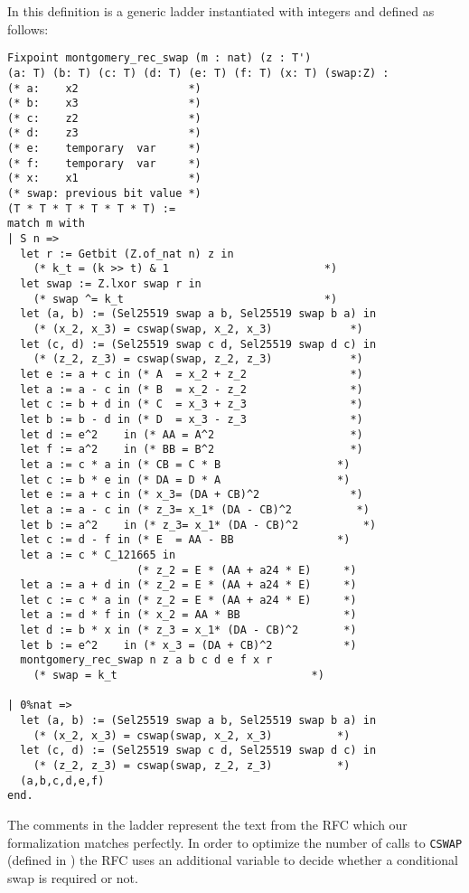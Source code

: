 In this definition  is a generic ladder instantiated
with integers and defined as follows:
\begin{lstlisting}[language=Coq]
Fixpoint montgomery_rec_swap (m : nat) (z : T')
(a: T) (b: T) (c: T) (d: T) (e: T) (f: T) (x: T) (swap:Z) :
(* a:    x2                 *)
(* b:    x3                 *)
(* c:    z2                 *)
(* d:    z3                 *)
(* e:    temporary  var     *)
(* f:    temporary  var     *)
(* x:    x1                 *)
(* swap: previous bit value *)
(T * T * T * T * T * T) :=
match m with
| S n =>
  let r := Getbit (Z.of_nat n) z in
    (* k_t = (k >> t) & 1                        *)
  let swap := Z.lxor swap r in
    (* swap ^= k_t                               *)
  let (a, b) := (Sel25519 swap a b, Sel25519 swap b a) in
    (* (x_2, x_3) = cswap(swap, x_2, x_3)            *)
  let (c, d) := (Sel25519 swap c d, Sel25519 swap d c) in
    (* (z_2, z_3) = cswap(swap, z_2, z_3)            *)
  let e := a + c in (* A  = x_2 + z_2                *)
  let a := a - c in (* B  = x_2 - z_2                *)
  let c := b + d in (* C  = x_3 + z_3                *)
  let b := b - d in (* D  = x_3 - z_3                *)
  let d := e^2    in (* AA = A^2                     *)
  let f := a^2    in (* BB = B^2                     *)
  let a := c * a in (* CB = C * B                  *)
  let c := b * e in (* DA = D * A                  *)
  let e := a + c in (* x_3= (DA + CB)^2              *)
  let a := a - c in (* z_3= x_1* (DA - CB)^2          *)
  let b := a^2    in (* z_3= x_1* (DA - CB)^2          *)
  let c := d - f in (* E  = AA - BB                *)
  let a := c * C_121665 in
                    (* z_2 = E * (AA + a24 * E)     *)
  let a := a + d in (* z_2 = E * (AA + a24 * E)     *)
  let c := c * a in (* z_2 = E * (AA + a24 * E)     *)
  let a := d * f in (* x_2 = AA * BB                *)
  let d := b * x in (* z_3 = x_1* (DA - CB)^2       *)
  let b := e^2    in (* x_3 = (DA + CB)^2           *)
  montgomery_rec_swap n z a b c d e f x r
    (* swap = k_t                              *)

| 0%nat =>
  let (a, b) := (Sel25519 swap a b, Sel25519 swap b a) in
    (* (x_2, x_3) = cswap(swap, x_2, x_3)          *)
  let (c, d) := (Sel25519 swap c d, Sel25519 swap d c) in
    (* (z_2, z_3) = cswap(swap, z_2, z_3)          *)
  (a,b,c,d,e,f)
end.
\end{lstlisting}

The comments in the ladder represent the text from the RFC which
our formalization matches perfectly. In order to optimize the
number of calls to \texttt{CSWAP} (defined in )
the RFC uses an additional variable to decide whether a conditional swap
is required or not.

